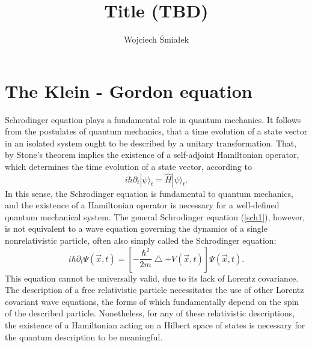 \documentclass[11pt]{article}
\numberwithin{equation}{section}
\begin{document}
    \title{Title (TBD)}
    \author{Wojciech Śmiałek}
    \date{}
    \maketitle


    \section{The Klein - Gordon equation}
    Schrodinger equation plays a fundamental role in quantum mechanics. It follows from the postulates 
    of quantum mechanics, that a time evolution of a state vector in an isolated system ought to be described by a unitary transformation. 
    That, by Stone's theorem \cite{stone} implies the existence of a self-adjoint Hamiltonian operator, which determines
    the time evolution of a state vector, according to
    \begin{equation}
     i \hbar \partial_t |\psi\rangle_t = \hat H |\psi\rangle_t \label{sch1}.
    \end{equation}
    In this sense, the Schrodinger equation is fundamental to quantum mechanics, and the existence of a Hamiltonian operator is necessary for a well-defined quantum mechanical system.
    The general Schrodinger equation (\ref{sch1}), however, is not equivalent to a wave equation governing the dynamics of a single nonrelativistic particle, often also simply called the Schrodinger equation:
    \begin{equation}
     i \hbar \partial_t \Psi(\vec x, t) = \left[ -\frac{\hbar^2}{2m} \bigtriangleup + V(\vec x,t) \right] \Psi(\vec x, t) \label{sch2}.
    \end{equation} 
    This equation cannot be universally valid, due to its lack of Lorentz covariance.
    The description of a free relativistic particle necessitates the use of other Lorentz covariant wave equations,
    the forms of which fundamentally depend on the spin of the described particle. 
    Nonetheless, for any of these relativistic descriptions, the existence of a Hamiltonian acting 
    on a Hilbert space of states is necessary for the quantum description to be meaningful.
    
\end{document}
